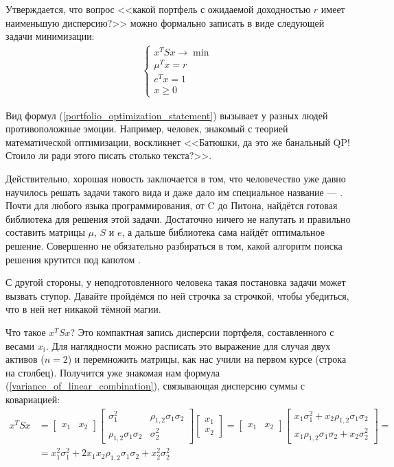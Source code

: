 Утверждается, что вопрос <<какой портфель с ожидаемой доходностью $r$ имеет наименьшую дисперсию?>> можно формально записать в виде следующей задачи минимизации:
\begin{align}
\begin{cases}
x^TSx \to \min \\
\mu^Tx = r \\
e^Tx = 1 \\
x \ge 0
\end{cases}
\label{portfolio_optimization_statement}
\end{align}

Вид формул (\ref{portfolio_optimization_statement}) вызывает у разных людей противоположные эмоции. Например, человек, знакомый с теорией математической оптимизации, воскликнет <<Батюшки, да это же банальный QP! Стоило ли ради этого писать столько текста?>>.

Действительно, хорошая новость заключается в том, что человечество уже давно научилось решать задачи такого вида и даже дало им специальное название ---  \cite[ch.~7--8]{cornuejols2006optimization}. Почти для любого языка программирования, от C до Питона, найдётся готовая библиотека для решения этой задачи. Достаточно ничего не напутать и правильно составить матрицы $\mu$, $S$ и $e$, а дальше библиотека сама найдёт оптимальное решение. Совершенно не обязательно разбираться в том, какой алгоритм поиска решения крутится под капотом .

С другой стороны, у неподготовленного человека такая постановка задачи может вызвать ступор. Давайте пройдёмся по ней строчка за строчкой, чтобы убедиться, что в ней нет никакой тёмной магии.

Что такое $x^TSx$? Это компактная запись дисперсии портфеля, составленного с весами $x_i$. Для наглядности можно расписать это выражение для случая двух активов ($n=2$) и перемножить матрицы, как нас учили на первом курсе (строка на столбец). Получится уже знакомая нам формула (\ref{variance_of_linear_combination}), связывающая дисперсию суммы с ковариацией:
\begin{align*}
x^TSx &= 
\begin{bmatrix}x_1 & x_2\end{bmatrix}
\begin{bmatrix}
\sigma_1^2 & \rho_{1,2}\sigma_1\sigma_2 \\
\rho_{1,2}\sigma_1\sigma_2 & \sigma_2^2
\end{bmatrix}
\begin{bmatrix}
x_1 \\
x_2
\end{bmatrix}
=
\begin{bmatrix}x_1 & x_2\end{bmatrix}
\begin{bmatrix}
x_1\sigma_1^2 + x_2\rho_{1,2}\sigma_1\sigma_2 \\
x_1\rho_{1,2}\sigma_1\sigma_2 + x_2\sigma_2^2
\end{bmatrix} = \\
&= 
x_1^2\sigma_1^2 + 2x_1x_2\rho_{1,2}\sigma_1\sigma_2 + x_2^2\sigma_2^2
\end{align*}

